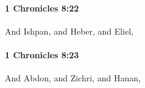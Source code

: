 		\paragraph{1 Chronicles 8:22} %
			\label{1CHRONICLES-8-22}

			And Ishpan, and Heber, and Eliel,


		\paragraph{1 Chronicles 8:23} %
			\label{1CHRONICLES-8-23}

			And Abdon, and Zichri, and Hanan,


